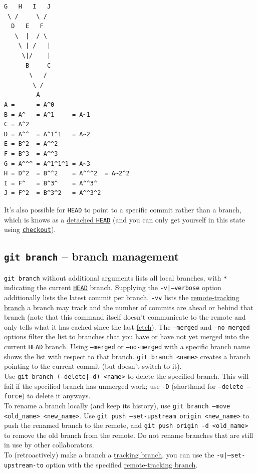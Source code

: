 \documentclass[table, xcdraw]{article}%
\begin{document}
\begin{verbatim}
G   H   I   J
 \ /     \ /
  D   E   F
   \  |  / \
    \ | /   |
     \|/    |
      B     C
       \   /
        \ /
         A
A =      = A^0
B = A^   = A^1     = A~1
C = A^2
D = A^^  = A^1^1   = A~2
E = B^2  = A^^2
F = B^3  = A^^3
G = A^^^ = A^1^1^1 = A~3
H = D^2  = B^^2    = A^^^2  = A~2^2
I = F^   = B^3^    = A^^3^
J = F^2  = B^3^2   = A^^3^2
\end{verbatim}

It's also possible for \texttt{HEAD} to point to a specific commit rather than a branch, which is knows as a \hyperref[checkout]{detached \texttt{HEAD}} (and you can only get yourself in this state using \hyperref[checkout]{\texttt{checkout}}).

\subsection{\texttt{git branch} -- branch management} \label{branch}

\texttt{git branch} without additional arguments lists all local branches, with \texttt{*} indicating the current \hyperref[branching]{\texttt{HEAD}} branch. Supplying the \texttt{-v|--verbose} option additionally lists the latest commit per branch. \texttt{-vv} lists the \hyperref[remotes]{remote-tracking branch} a branch may track and the number of commits are ahead or behind that branch (note that this command itself doesn't communicate to the remote and only tells what it has cached since the last \hyperref[fetch]{fetch}). The \texttt{--merged} and \texttt{--no-merged} options filter the list to branches that you have or have not yet merged into the current \hyperref[branching]{\texttt{HEAD}} branch. Using \texttt{--merged} or \texttt{--no-merged} with a specific branch name shows the list with respect to that branch.
\texttt{git branch <name>} creates a branch pointing to the current commit (but doesn't switch to it).\\
Use \texttt{git branch (--delete|-d) <name>} to delete the specified branch. This will fail if the specified branch has unmerged work; use \texttt{-D} (shorthand for \texttt{--delete --force}) to delete it anyways.\\
To rename a branch locally (and keep its history), use \texttt{git branch --move <old_name> <new_name>}. Use \texttt{git push --set-upstream origin <new_name>} to push the renamed branch to the remote, and \texttt{git push origin -d <old_name>} to remove the old branch from the remote. Do not rename branches that are still in use by other collaborators.\\
To (retroactively) make a branch a \hyperref[remotes]{tracking branch}, you can use the \texttt{-u|--set-upstream-to} option with the specified \hyperref[remotes]{remote-tracking branch}.
\end{document}
